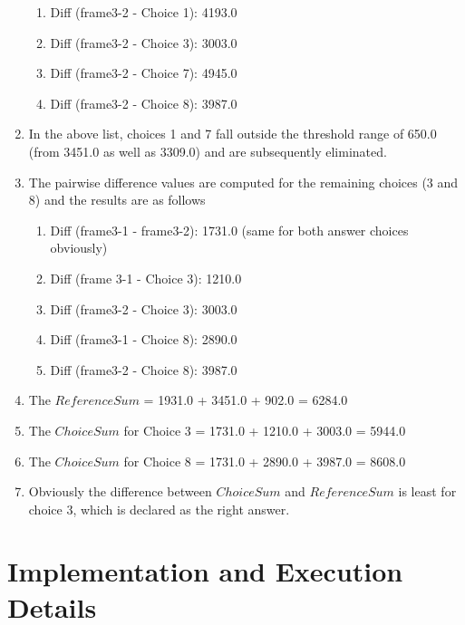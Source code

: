 \documentclass[10pt, letter]{article}
\begin{document}
\begin{enumerate}
\begin{enumerate}
		\item Diff (frame3-2 - Choice 1): 4193.0
		\item Diff (frame3-2 - Choice 3): 3003.0
		\item Diff (frame3-2 - Choice 7): 4945.0
		\item Diff (frame3-2 - Choice 8): 3987.0		
	\end{enumerate}
\item In the above list, choices 1 and 7 fall outside the threshold range of 650.0 (from 3451.0 as well as 3309.0) and are subsequently eliminated.
\item The pairwise difference values are computed for the remaining choices (3 and 8) and the results are as follows
	\begin{enumerate}
		\item Diff (frame3-1 - frame3-2): 1731.0 (same for both answer choices obviously)
		\item Diff (frame 3-1 - Choice 3): 1210.0
		\item Diff (frame3-2 - Choice 3): 3003.0
		\item Diff (frame3-1 - Choice 8): 2890.0
		\item Diff (frame3-2 - Choice 8): 3987.0 
	\end{enumerate}
\item The $ReferenceSum$ = 1931.0 + 3451.0 + 902.0 = 6284.0
\item The $ChoiceSum$ for Choice 3 = 1731.0 + 1210.0 + 3003.0 = 5944.0
\item The $ChoiceSum$ for Choice 8 = 1731.0 + 2890.0 + 3987.0 = 8608.0
\item Obviously the difference between $ChoiceSum$ and $ReferenceSum$ is least for choice 3, which is declared as the right answer.
\end{enumerate}

\section{Implementation and Execution Details}
\end{document}
